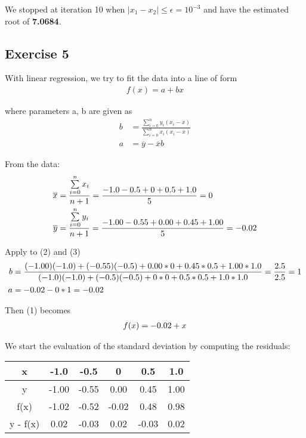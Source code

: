 \documentclass[12pt]{article}
\begin{document}
\noindent We stopped at iteration 10 when \(|x_1-x_2| \leq \epsilon = 10^{-3}\) and have the estimated root of \textbf{7.0684}.


\subsection{Exercise 5}

With linear regression, we try to fit the data into a line of form
\begin{align}
  f(x)=a+bx
\end{align}

where parameters a, b are given as
\begin{align}
  b&=\frac{\sum\limits_{i=0}^{n} y_i(x_i-\overline{x})}{\sum\limits_{i=0}^{n} x_i(x_i-\overline{x})}\\
  a&=\overline{y}-\overline{x}b
\end{align}

From the data:
\begin{align}
  \notag
  \overline{x}&=\frac{\sum\limits_{i=0}^{n} x_i}{n+1} = \frac{-1.0-0.5+0+0.5+1.0}{5} = 0 \\
  \notag
  \overline{y}&=\frac{\sum\limits_{i=0}^{n} y_i}{n+1}= \frac{-1.00 - 0.55 + 0.00 + 0.45 + 1.00}{5} = -0.02
\end{align}

Apply to (2) and (3)
\begin{align}
  \notag
  b&= \frac{(-1.00)(-1.0) + (-0.55)(-0.5) + 0.00*0 + 0.45*0.5 + 1.00*1.0}{(-1.0)(-1.0)+(-0.5)(-0.5)+0*0+0.5*0.5+1.0*1.0} = \frac{2.5}{2.5} = 1\\
  \notag
  a&=-0.02-0*1=-0.02
\end{align}

Then (1) becomes
\begin{align}
  \notag
  f(x)=-0.02 + x
\end{align}

We start the evaluation of the standard deviation by computing the residuals:

\begin{table}[h]
  \centering
  \begin{tabular}{|c|c|c|c|c|c|}
    \hline
    x & -1.0 & -0.5 & 0 & 0.5 & 1.0 \\ \hline
    y & -1.00 & -0.55 & 0.00 & 0.45 & 1.00 \\ \hline
    f(x) & -1.02 & -0.52 & -0.02 & 0.48 & 0.98 \\ \hline
    y - f(x) & 0.02 & -0.03 & 0.02 & -0.03 & 0.02 \\ \hline
  \end{tabular}
\end{table}
\end{document}
